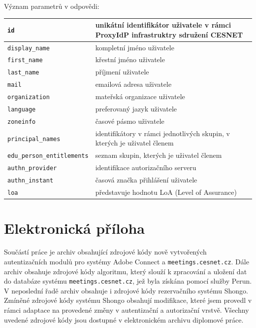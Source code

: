 \documentclass[
  printed, %
  twoside, %
  table,   %
  nolof,     %
  nolot,     %
]{fithesis3}
\begin{document}
\noindent
Význam parametrů v odpovědi:
\label{table:userinfo:resp}
\begin{table}[H]
\begin{tabular}{|l|l|}
\hline
\texttt{id}                         &   \parbox[t]{6.8cm}{unikátní identifikátor uživatele v rámci ProxyIdP infrastruktry sdružení CESNET}  \\ \hline
\texttt{display\_name}              & \parbox[t]{6.8cm}{kompletní jméno uživatele}  \\ \hline
\texttt{first\_name}                & \parbox[t]{6.8cm}{křestní jméno uživatele}  \\ \hline
\texttt{last\_name}                 & \parbox[t]{6.8cm}{příjmení uživatele}  \\ \hline
\texttt{mail}  & \parbox[t]{6.8cm}{emailová adresa uživatele}  \\ \hline
\texttt{organization}               & \parbox[t]{6.8cm}{mateřská organizace uživatele}  \\ \hline
\texttt{language}                   & \parbox[t]{6.8cm}{preferovaný jazyk uživatele}  \\ \hline
\texttt{zoneinfo}                   & \parbox[t]{6.8cm}{časové pásmo uživatele}  \\ \hline
\texttt{principal\_names}           & \parbox[t]{6.8cm}{identifikátory v rámci jednotlivých skupin, v kterých je uživatel členem}  \\ \hline
\texttt{edu\_person\_entitlements}  & \parbox[t]{6.8cm}{seznam skupin, kterých je uživatel členem}  \\ \hline
\texttt{authn\_provider}            & \parbox[t]{6.8cm}{identifikace autorizačního serveru}  \\ \hline
\texttt{authn\_instant}             & \parbox[t]{6.8cm}{časová značka přihlášení uživatele}  \\ \hline
\texttt{loa}                        & \parbox[t]{6.8cm}{představuje hodnotu LoA (Level of Assurance)}  \\ \hline

\end{tabular}
\end{table}

\chapter{Elektronická příloha}
Součástí práce je archiv obsahující zdrojové kódy nově vytvořených autentizačních modulů pro systémy Adobe Connect a \texttt{meetings.cesnet.cz}. Dále archiv obsahuje zdrojové kódy algoritmu, který slouží k zpracování a uložení dat do databáze systému \texttt{meetings.cesnet.cz}, jež byla získána pomocí služby Perun. V neposlední řadě archiv obsahuje i zdrojové kódy rezervačního systému Shongo. Zmíněné zdrojové kódy systému Shongo obsahují modifikace, které jsem provedl v rámci adaptace na provedené změny v autentizační a autorizační vrstvě. Všechny uvedené zdrojové kódy jsou dostupné v elektronickém archivu diplomové práce. 
\end{document}
